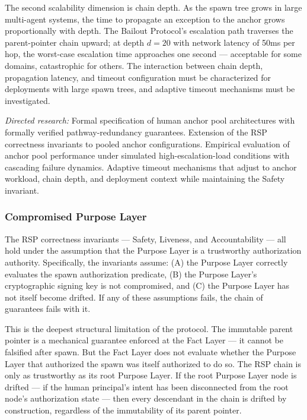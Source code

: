 The second scalability dimension is chain depth. As the spawn tree grows in large multi-agent systems, the time to propagate an exception to the anchor grows proportionally with depth. The Bailout Protocol's escalation path traverses the parent-pointer chain upward; at depth $d=20$ with network latency of 50ms per hop, the worst-case escalation time approaches one second — acceptable for some domains, catastrophic for others. The interaction between chain depth, propagation latency, and timeout configuration must be characterized for deployments with large spawn trees, and adaptive timeout mechanisms must be investigated.

\textit{Directed research:} Formal specification of human anchor pool architectures with formally verified pathway-redundancy guarantees. Extension of the RSP correctness invariants to pooled anchor configurations. Empirical evaluation of anchor pool performance under simulated high-escalation-load conditions with cascading failure dynamics. Adaptive timeout mechanisms that adjust to anchor workload, chain depth, and deployment context while maintaining the Safety invariant.

\subsubsection{Compromised Purpose Layer}
\label{sec:compromised-purpose-layer}

The RSP correctness invariants — Safety, Liveness, and Accountability — all hold under the assumption that the Purpose Layer is a trustworthy authorization authority. Specifically, the invariants assume: (A) the Purpose Layer correctly evaluates the spawn authorization predicate, (B) the Purpose Layer's cryptographic signing key is not compromised, and (C) the Purpose Layer has not itself become drifted. If any of these assumptions fails, the chain of guarantees fails with it.

This is the deepest structural limitation of the protocol. The immutable parent pointer is a mechanical guarantee enforced at the Fact Layer — it cannot be falsified after spawn. But the Fact Layer does not evaluate whether the Purpose Layer that authorized the spawn was itself authorized to do so. The RSP chain is only as trustworthy as its root Purpose Layer. If the root Purpose Layer node is drifted — if the human principal's intent has been disconnected from the root node's authorization state — then every descendant in the chain is drifted by construction, regardless of the immutability of its parent pointer.

